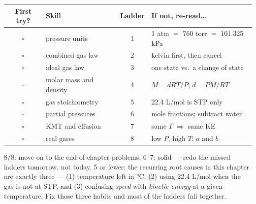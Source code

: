 \documentclass{apchem-worksheet}
\begin{document}
\renewcommand{\arraystretch}{1.35}
\noindent\begin{tabular}{@{}c p{6.4cm} c p{4.6cm}@{}}
\toprule
\textbf{First try?} & \textbf{Skill} & \textbf{Ladder} &
  \textbf{If not, re-read\ldots}\\
\midrule
$\square$ & pressure units & 1 & 1 atm $=$ 760 torr $=$ 101.325 kPa \\
$\square$ & combined gas law & 2 & kelvin first, then cancel \\
$\square$ & ideal gas law & 3 & one state vs.\ a change of state \\
$\square$ & molar mass and density & 4 & $M = dRT/P$; $d = PM/RT$ \\
$\square$ & gas stoichiometry & 5 & 22.4 L/mol is STP only \\
$\square$ & partial pressures & 6 & mole fractions; subtract water \\
$\square$ & KMT and effusion & 7 & same $T$ $\Rightarrow$ same KE \\
$\square$ & real gases & 8 & low $P$, high $T$; $a$ and $b$ \\
\bottomrule
\end{tabular}

\begin{apcnote}
8/8: move on to the end-of-chapter problems. 6--7: solid --- redo the
missed ladders tomorrow, not today. 5 or fewer: the recurring root causes
in this chapter are exactly three --- (1) temperature left in
\si{\celsius}, (2) using 22.4 L/mol when the gas is not at STP, and
(3) confusing \emph{speed} with \emph{kinetic energy} at a given
temperature. Fix those three habits and most of the ladders fall
together.
\end{apcnote}
\end{document}
